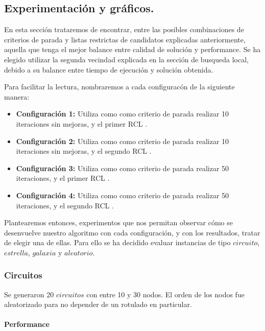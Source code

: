 \subsection{Experimentación y gráficos.}

\vspace*{0.3cm}

En esta sección trataremos de encontrar, entre las posibles combinaciones de criterios de parada y listas restrictas de candidatos explicadas anteriormente, aquella que tenga el mejor balance entre calidad de solución y performance. Se ha elegido utilizar la segunda vecindad explicada en la sección de busqueda local, debido a su balance entre tiempo de ejecución y solución obtenida.  

Para facilitar la lectura, nombraremos a cada configuracón de la siguiente manera:

\begin{itemize}
	\item {\bf Configuración 1:} Utiliza como como criterio de parada realizar 10 iteraciones sin mejoras, y el primer RCL .
	\item {\bf Configuración 2:} Utiliza como como criterio de parada realizar 10 iteraciones sin mejoras, y el segundo RCL .
	\item {\bf Configuración 3:} Utiliza como como criterio de parada realizar 50 iteraciones, y el primer RCL .
	\item {\bf Configuración 4:} Utiliza como como criterio de parada realizar 50 iteraciones, y el segundo RCL .

\end{itemize}

Plantearemos entonces, experimentos que nos permitan observar cómo se desenvuelve nuestro algoritmo con cada configuración, y con los resultados, tratar de elegir una de ellas. Para ello se ha decidido evaluar instancias de tipo $circuito$, $estrella$, $galaxia$ y $aleatorio$.
 
\subsubsection{Circuitos}

Se generaron 20 $circuitos$ con entre 10 y 30 nodos.  El orden de los nodos fue aleatorizado para no depender de un rotulado en particular.

\paragraph{Performance} 

